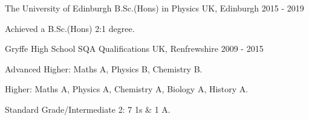 


\begin{cventries}

  \cventry
    {The University of Edinburgh} %
    {B.Sc.(Hons) in Physics} %
    {UK, Edinburgh} %
    {2015 - 2019} %
    {
      \begin{cvitems} %
        \item{Achieved a B.Sc.(Hons) 2:1 degree.}
      \end{cvitems}
    }
    
  \cventry
    {Gryffe High School} %
    {SQA Qualifications} %
    {UK, Renfrewshire} %
    {2009 - 2015} %
    {
      \begin{cvitems} %
        \item {Advanced Higher: Maths A, Physics B, Chemistry B.}
        \item {Higher: Maths A, Physics A, Chemistry A, Biology A, History A.}
        \item {Standard Grade/Intermediate 2: 7 1s \& 1 A.}
      \end{cvitems}
    }

\end{cventries}
